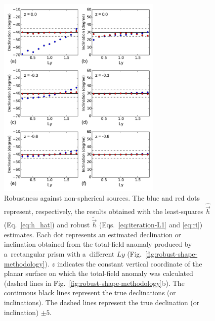 \documentclass[journal abbreviation, npg]{copernicus}
\begin{document}
\begin{figure}[t]
\includegraphics[width=80mm]{Figures/npgd-2014-0069-f06}
\caption{Robustness against non-spherical sources. The blue and red
  dots represent, respectively, the results obtained with the
  least-squares $\hat{\vec{h}}$ (Eq.~\ref{eq:h_hat}) and robust
  $\tilde{\vec{h}}$ (Eqs.~\ref{eq:iteration-L1} and \ref{eq:ri})
  estimates. Each dot represents an estimated declination or
  inclination obtained from the total-field anomaly produced by
  a~rectangular prism with a~different $Ly$
  (Fig.~\ref{fig:robust-shape-methodology}). $z$ indicates the constant
  vertical coordinate of the planar surface on which the total-field
  anomaly was calculated (dashed lines in
  Fig.~\ref{fig:robust-shape-methodology}b). The continuous black
  lines represent the true declinations (or inclinations). The dashed
  lines represent the true declination (or inclination) $\pm
  5${\degree}.}
\label{fig:robust-shape-results}
\end{figure}
\end{document}
